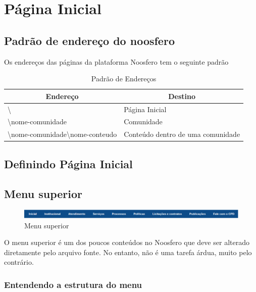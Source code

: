 \chapter{Página Inicial}
\label{chap:paginaInicial}

\section{Padrão de endereço do noosfero}
\label{sec:padraoEndereco}

Os endereços das páginas da plataforma Noosfero tem o seguinte padrão

\begin{table}[h]
\begin{tabular}{|l|l|}
  \hline
  \multicolumn{1}{|c|}{\textbf{Endereço}} & \multicolumn{1}{c|}{\textbf{Destino}} \\
  \hline
  \textbackslash & Página Inicial \\
  \textbackslash nome-comunidade & Comunidade \\
  \textbackslash nome-comunidade\textbackslash nome-conteudo & Conteúdo dentro de uma comunidade \\
  \hline
\end{tabular}
\caption {Padrão de Endereços}
\end{table}

\section{Definindo Página Inicial}
\label{sec:paginaInicial}

\section{Menu superior}
\label{menuSuperior}
\begin{figure}[h]
     \centering
       \includegraphics[keepaspectratio=true,scale=0.49]{figuras/menu_superior}
     \caption{Menu superior}
\end{figure}

O menu superior é um dos poucos conteúdos no Noosfero que deve ser alterado 
diretamente pelo arquivo fonte. No entanto, não é uma tarefa árdua, muito pelo
contrário.

\newpage
\subsection{Entendendo a estrutura do menu}

